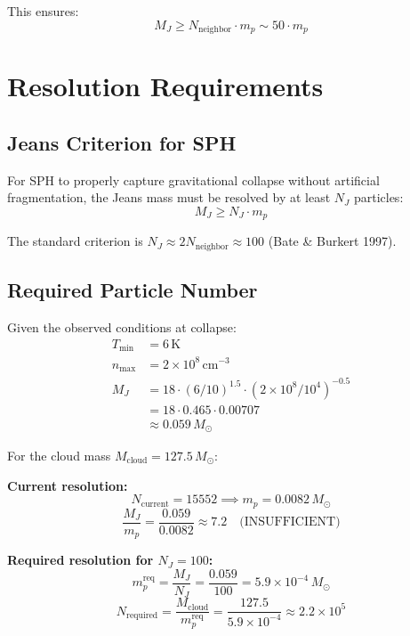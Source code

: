 \documentclass[12pt,a4paper]{article}
\begin{document}
This ensures:
\begin{equation}
    \boxed{M_J \geq N_{\text{neighbor}} \cdot m_p \sim 50 \cdot m_p}
\end{equation}

\section{Resolution Requirements}

\subsection{Jeans Criterion for SPH}

For SPH to properly capture gravitational collapse without artificial
fragmentation, the Jeans mass must be resolved by at least $N_J$ particles:
\begin{equation}
    M_J \geq N_J \cdot m_p
\end{equation}

The standard criterion is $N_J \approx 2 N_{\text{neighbor}} \approx 100$
(Bate \& Burkert 1997).

\subsection{Required Particle Number}

Given the observed conditions at collapse:
\begin{align}
    T_{\min} &= 6 \, \text{K} \\
    n_{\max} &= 2 \times 10^8 \, \text{cm}^{-3} \\
    M_J &= 18 \cdot (6/10)^{1.5} \cdot (2 \times 10^8 / 10^4)^{-0.5} \\
        &= 18 \cdot 0.465 \cdot 0.00707 \\
        &\approx 0.059 \, M_\odot
\end{align}

For the cloud mass $M_{\text{cloud}} = 127.5 \, M_\odot$:

\textbf{Current resolution:}
\begin{equation}
    N_{\text{current}} = 15552 \implies m_p = 0.0082 \, M_\odot
\end{equation}
\begin{equation}
    \frac{M_J}{m_p} = \frac{0.059}{0.0082} \approx 7.2 \quad \text{(INSUFFICIENT)}
\end{equation}

\textbf{Required resolution for $N_J = 100$:}
\begin{equation}
    m_p^{\text{req}} = \frac{M_J}{N_J} = \frac{0.059}{100} = 5.9 \times 10^{-4} \, M_\odot
\end{equation}
\begin{equation}
    \boxed{N_{\text{required}} = \frac{M_{\text{cloud}}}{m_p^{\text{req}}}
    = \frac{127.5}{5.9 \times 10^{-4}} \approx 2.2 \times 10^5}
\end{equation}
\end{document}
